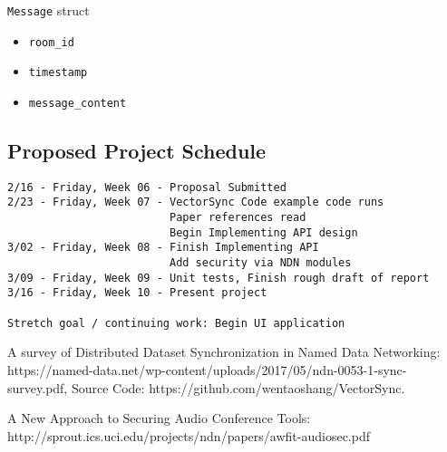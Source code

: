 \documentclass[letterpaper, 10 pt, conference]{ieeeconf}  %
\begin{document}
\verb|Message| struct
\begin{itemize}
\item \begin{verbatim}room_id\end{verbatim} 
\item \begin{verbatim}timestamp\end{verbatim} 
\item \begin{verbatim}message_content\end{verbatim}
\end{itemize}

\subsection{Proposed Project Schedule}
\begin{verbatim}
2/16 - Friday, Week 06 - Proposal Submitted
2/23 - Friday, Week 07 - VectorSync Code example code runs
                         Paper references read
                         Begin Implementing API design
3/02 - Friday, Week 08 - Finish Implementing API 
                         Add security via NDN modules     
3/09 - Friday, Week 09 - Unit tests, Finish rough draft of report
3/16 - Friday, Week 10 - Present project

Stretch goal / continuing work: Begin UI application 
\end{verbatim}
\addtolength{\textheight}{-12cm}   %


\begin{thebibliography}{99}

 A survey of Distributed Dataset Synchronization in Named Data Networking: https://named-data.net/wp-content/uploads/2017/05/ndn-0053-1-sync-survey.pdf, Source Code: https://github.com/wentaoshang/VectorSync.

 A New Approach to Securing Audio Conference Tools: http://sprout.ics.uci.edu/projects/ndn/papers/awfit-audiosec.pdf

\end{thebibliography}
\end{document}

